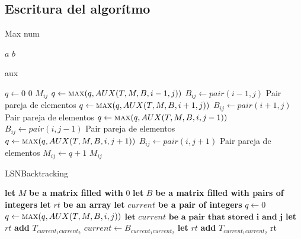 \documentclass[letter]{article}
\begin{document}
\subsection{Escritura del algor\'itmo}
\begin{algorithm}[!htb]
	\caption{Max num}
	\begin{algorithmic}[1]
		\State \Return $a$
		\Else
		\State \Return $b$
		\EndIf
		\EndFunction
	\end{algorithmic}
\end{algorithm}
\begin{algorithm}[!htb]
  \caption{aux}
	\begin{algorithmic}[1]
		\State $q \gets 0$
    \State \Return $0$
    \State \Return $M_{ij}$
		\Else
    \State $q \gets \Call{max}{q,AUX(T,M,B,i-1,j)}$
    \State $B_{ij} \gets pair(i-1,j)$ \Comment Pair pareja de elementos 
    \EndIf
    \EndIf
    \State $q \gets \Call{max}{q,AUX(T,M,B,i+1,j)}$
    \State $B_{ij} \gets pair(i+1,j)$ \Comment Pair pareja de elementos
    \EndIf
    \EndIf
    \State $q \gets \Call{max}{q,AUX(T,M,B,i,j-1)}$
    \State $B_{ij} \gets pair(i,j-1)$ \Comment Pair pareja de elementos 
    \EndIf
    \EndIf
    \State $q \gets \Call{max}{q,AUX(T,M,B,i,j+1)}$
    \State $B_{ij} \gets pair(i,j+1)$ \Comment Pair pareja de elementos
    \EndIf
    \EndIf
    \State $M_{ij} \gets q + 1 $
		\EndIf
    \State \Return $M_{ij}$
		\EndProcedure
	\end{algorithmic}
\end{algorithm}
\begin{algorithm}
	\caption{LSNBacktracking}
	\begin{algorithmic}[1]
    \State \textbf{let }$M$ \textbf{ be a matrix filled with } $0$
    \State \textbf{let }$B$ \textbf{ be a matrix filled with pairs of integers}
    \State \textbf{let }$rt$ \textbf{ be an array}
    \State \textbf{let }$current$ \textbf{ be a pair of integers}
    \State $q \gets 0$
    \State $q \gets \Call{max}{q,AUX(T,M,B,i,j)}$
    \State $\textbf{let }current \textbf{ be a pair that stored i and j}$
    \EndIf
    \EndFor
    \EndFor
    \State \textbf{let } $rt$ \textbf{ add  } $T_{current_1current_2}$
    \State $current \gets B_{current_1current_2}$
    \EndWhile
    \State \textbf{let } $rt$ \textbf{ add  } $T_{current_1current_2}$
    \State \Return rt
		\EndProcedure
	\end{algorithmic}
\end{algorithm}
\end{document}
